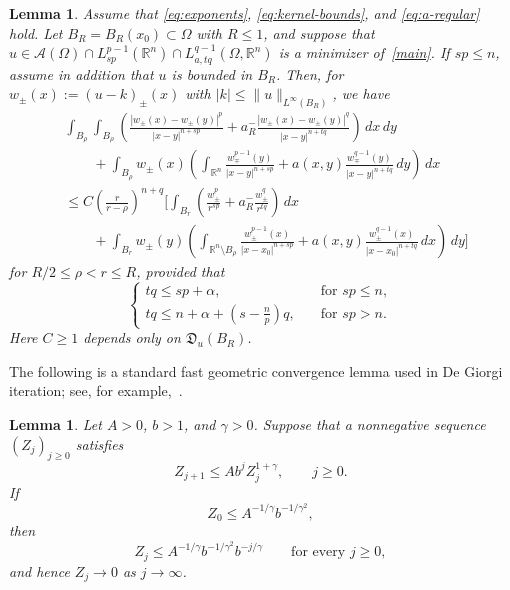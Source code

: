 \documentclass[reqno]{amsart}
\newcommand{\R}{\mathbb R}
\theoremstyle{plain}
\newtheorem{lemma}[theorem]{Lemma}
\theoremstyle{definition}
\theoremstyle{remark}
\numberwithin{equation}{section}
\begin{document}
\begin{lemma}
\label{cac}
Assume that \eqref{eq:exponents}, \eqref{eq:kernel-bounds}, and
\eqref{eq:a-regular} hold. Let \(B_R=B_R(x_0)\subset\Omega\) with \(R\le1\),
and suppose that
\(u\in\mathcal{A}(\Omega)\cap L^{p-1}_{sp}(\R^n)
\cap L^{q-1}_{a,tq}(\Omega,\R^n)\) is a minimizer of~\eqref{main}. If
\(sp\le n\), assume in addition that \(u\) is bounded in \(B_R\). Then, for
\(w_\pm(x):=(u-k)_\pm(x)\) with
\(|k|\le\|u\|_{L^\infty(B_R)}\), we have
\begin{align*}
&\int_{B_\rho}\int_{B_\rho} \left(\frac{|w_\pm(x)-w_\pm(y)|^p}{|x-y|^{n+sp}}+a^-_R\frac{|w_\pm(x)-w_\pm(y)|^q}{|x-y|^{n+tq}}\right)\, dx\,dy\\
&\qquad+\int_{B_\rho}w_\pm(x)\left(\int_{\mathbb{R}^n}\frac{w_\mp^{p-1}(y)}{|x-y|^{n+sp}}+a(x,y)\frac{w_\mp^{q-1}(y)}{|x-y|^{n+tq}}\,dy\right)\,dx\\
&\le C\left(\frac{r}{r-\rho}\right)^{n+q}\Bigg[\int_{B_r} \left(\frac{w_\pm^p}{r^{sp}}+a^-_R\frac{w_\pm^q}{r^{tq}}\right)\,dx\\
&\qquad+\int_{B_r}w_\pm(y)\left(\int_{\mathbb{R}^n\setminus B_\rho}\frac{w^{p-1}_\pm(x)}{|x-x_0|^{n+sp}}+a(x,y)\frac{w^{q-1}_\pm(x)}{|x-x_0|^{n+tq}}\,dx\right)\,dy\Bigg]
\end{align*}
for \(R/2\le\rho<r\le R\), provided that
\begin{equation}
\label{exp}
\begin{cases}
tq\le sp+\alpha,  \quad &\text{for } sp\le n,\\[2mm]
tq\le n+\alpha+\left(s-\frac{n}{p}\right)q,  \quad &\text{for } sp>n.
\end{cases}
\end{equation}
Here \(C\ge1\) depends only on \(\mathfrak D_u(B_R)\).
\end{lemma}

The following is a standard fast geometric convergence lemma used in De Giorgi iteration; see, for example,~\cite[Lemma~7.1]{Giu03}.

\begin{lemma}\label{lem:fast-convergence}
Let \(A>0\), \(b>1\), and \(\gamma>0\). Suppose that a nonnegative sequence
\((Z_j)_{j\ge0}\) satisfies
\begin{equation*}%
    Z_{j+1}\le A b^j Z_j^{1+\gamma},\qquad j\ge0.
\end{equation*}
If
\begin{equation*}%
    Z_0\le A^{-1/\gamma}b^{-1/\gamma^2},
\end{equation*}
then 
\begin{equation*}
   Z_j\le A^{-1/\gamma}b^{-1/\gamma^2}b^{-j/\gamma}
   \qquad\text{for every }j\ge0,
\end{equation*}
and hence \(Z_j\to0\) as \(j\to\infty\).
\end{lemma}
\end{document}
